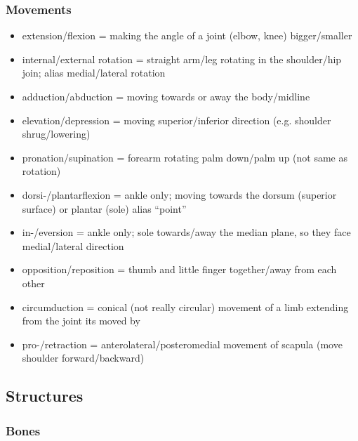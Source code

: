 \subsubsection{Movements}

\begin{itemize}
    \setlength\itemsep{0em}
    \item extension/flexion = making the angle of a joint (elbow, knee) bigger/smaller
    \item internal/external rotation = straight arm/leg rotating in the shoulder/hip join; alias medial/lateral rotation
    \item adduction/abduction = moving towards or away the body/midline
    \item elevation/depression = moving superior/inferior direction (e.g. shoulder shrug/lowering)
    \item pronation/supination = forearm rotating palm down/palm up (not same as rotation)
    \item dorsi-/plantarflexion = ankle only; moving towards the dorsum (superior surface) or plantar (sole) alias ``point''
    \item in-/eversion = ankle only; sole towards/away the median plane, so they face medial/lateral direction
    \item opposition/reposition = thumb and little finger together/away from each other
    \item circumduction = conical (not really circular) movement of a limb extending from the joint its moved by
    \item pro-/retraction = anterolateral/posteromedial movement of scapula (move shoulder forward/backward)
\end{itemize}

\subsection{Structures}\label{subsec:structures}

\subsubsection{Bones}

